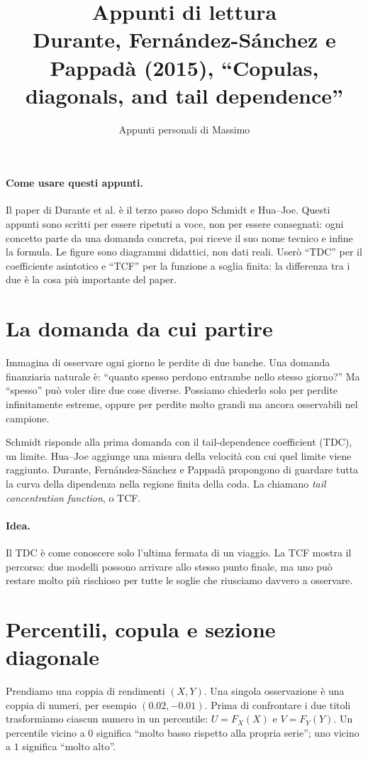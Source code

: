 \documentclass[11pt,a4paper]{article}
\title{Appunti di lettura\\\large Durante, Fernández-Sánchez e Pappadà (2015), ``Copulas, diagonals, and tail dependence''}
\author{Appunti personali di Massimo}
\date{}
\newcommand{\Idea}{\paragraph{Idea.}}
\begin{document}
\maketitle

\paragraph{Come usare questi appunti.}
Il paper di Durante et al. è il terzo passo dopo Schmidt e Hua--Joe. Questi
appunti sono scritti per essere ripetuti a voce, non per essere consegnati: ogni
concetto parte da una domanda concreta, poi riceve il suo nome tecnico e infine
la formula. Le figure sono diagrammi didattici, non dati reali. Userò ``TDC''
per il coefficiente asintotico e ``TCF'' per la funzione a soglia finita: la
differenza tra i due è la cosa più importante del paper.

\section{La domanda da cui partire}

Immagina di osservare ogni giorno le perdite di due banche. Una domanda
finanziaria naturale è: ``quanto spesso perdono entrambe nello stesso giorno?''
Ma ``spesso'' può voler dire due cose diverse. Possiamo chiederlo solo per
perdite infinitamente estreme, oppure per perdite molto grandi ma ancora
osservabili nel campione.

Schmidt risponde alla prima domanda con il tail-dependence coefficient (TDC),
un limite. Hua--Joe aggiunge una misura della velocità con cui quel limite viene
raggiunto. Durante, Fernández-Sánchez e Pappadà propongono di guardare tutta la
curva della dipendenza nella regione finita della coda. La chiamano \emph{tail
concentration function}, o TCF.

\Idea Il TDC è come conoscere solo l'ultima fermata di un viaggio. La TCF
mostra il percorso: due modelli possono arrivare allo stesso punto finale, ma
uno può restare molto più rischioso per tutte le soglie che riusciamo davvero a
osservare.

\section{Percentili, copula e sezione diagonale}

Prendiamo una coppia di rendimenti $(X,Y)$. Una singola osservazione è una
coppia di numeri, per esempio $(0.02,-0.01)$. Prima di confrontare i due titoli
trasformiamo ciascun numero in un percentile: $U=F_X(X)$ e $V=F_Y(Y)$. Un
percentile vicino a $0$ significa ``molto basso rispetto alla propria serie'';
uno vicino a $1$ significa ``molto alto''.
\end{document}
